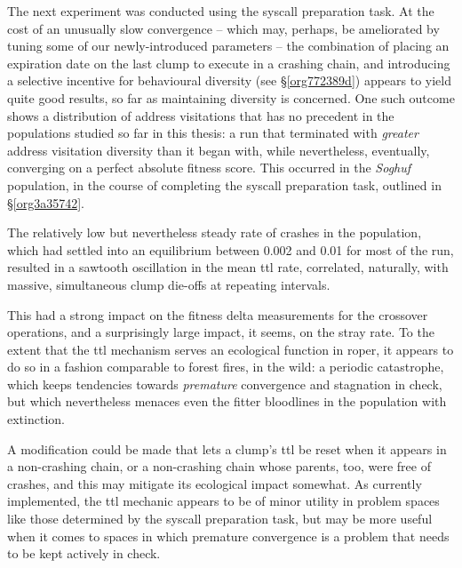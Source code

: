 \documentclass[12pt,glossary]{dalthesis}
\begin{document}
The next experiment was conducted using the syscall preparation task. 
At the cost of an unusually slow convergence -- which may, perhaps, be
ameliorated by tuning some of our newly-introduced parameters -- the combination
of placing an expiration date on the last clump to execute in a crashing chain,
and introducing a selective incentive for behavioural diversity (see \S \ref{org772389d}) appears to yield
quite good results, so far as maintaining diversity is concerned. One such outcome
shows a distribution of address visitations that has no precedent in the populations
studied so far in this thesis: a run that terminated with \emph{greater} address visitation
diversity than it began with, while nevertheless, eventually, converging on a perfect
absolute fitness score. This occurred in the \emph{Soghuf} population, in the course of
completing the syscall preparation task, outlined in \S \ref{org3a35742}.

The relatively low but nevertheless
steady rate of crashes in the population, which had settled into an equilibrium between
0.002 and 0.01 for most of the run, resulted in a sawtooth oscillation in the
mean \gls{ttl} rate, correlated, naturally, with massive, simultaneous clump die-offs at
repeating intervals. 

This had a strong impact on the fitness delta measurements for
the crossover operations, and a surprisingly large impact, it seems, on the stray
rate. To the extent that the \gls{ttl} mechanism serves an ecological function in
\gls{roper}, it appears to do so in a fashion comparable to forest fires, in the wild:
a periodic catastrophe, which keeps tendencies towards \emph{premature} convergence and
stagnation in check, but which nevertheless menaces even the fitter bloodlines in
the population with extinction. 

A modification could be made that lets a clump's \gls{ttl} be reset when
it appears in a non-crashing chain, or a non-crashing chain whose parents, too, were
free of crashes, and this may mitigate its ecological
impact somewhat. As currently implemented, the \gls{ttl} mechanic appears to be of
minor utility in problem spaces like those determined by the syscall preparation
task, but may be more useful when it comes to spaces in which premature
convergence is a problem that needs to be kept actively in check.
\end{document}
